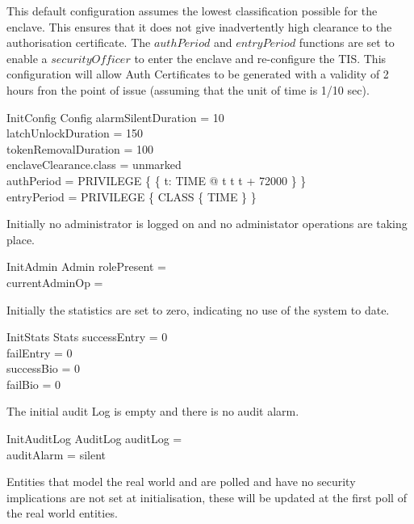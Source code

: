 This default configuration assumes the lowest classification possible
for the enclave. This ensures that it does not give inadvertently
high clearance to the authorisation certificate. The $authPeriod$
and $entryPeriod$ functions are set to enable a $securityOfficer$ to
enter the enclave and re-configure the TIS. This configuration will
allow Auth Certificates to be generated with a validity of 2 hours
fron the point of issue (assuming that the unit of time is 1/10 sec).
\begin{schema}{InitConfig}
        Config
\where
	alarmSilentDuration = 10
\\      latchUnlockDuration = 150
\\      tokenRemovalDuration = 100
\\      enclaveClearance.class = unmarked
\\      authPeriod = PRIVILEGE \cross \{ \{ t: TIME @ t \mapsto t \upto t
+ 72000 \} \}
\\      entryPeriod = PRIVILEGE \cross \{ CLASS \cross \{ TIME \} \}
\end{schema}

Initially no administrator is logged on and no administator operations
are taking place.
\begin{schema}{InitAdmin}
        Admin
\where
        rolePresent = \Nil
\\      currentAdminOp = \Nil
\end{schema}

Initially the statistics are set to zero, indicating no use of the
system to date.
\begin{schema}{InitStats}
        Stats
\where
        successEntry = 0
\\      failEntry = 0
\\      successBio = 0
\\      failBio = 0
\end{schema}        

The initial audit Log is empty and there is no audit alarm.

\begin{schema}{InitAuditLog}
        AuditLog
\where
        auditLog = \emptyset
\\      auditAlarm = silent
\end{schema}        

Entities that model the real world and are polled and have no security
implications are not set 
at initialisation, these will be updated at the first poll of the real
world entities.

